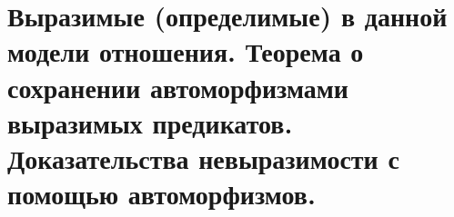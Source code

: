 \section{Выразимые (определимые) в данной модели отношения. Теорема о сохранении автоморфизмами выразимых предикатов. Доказательства невыразимости с помощью автоморфизмов.}